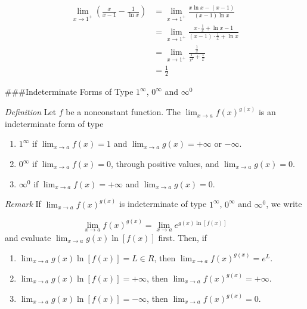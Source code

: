 \documentclass[
  letterpaper,
  DIV=11,
  numbers=noendperiod]{scrartcl}
\theoremstyle{plain}
\theoremstyle{remark}
\begin{document}
\[
\begin{aligned}
\displaystyle\lim_{x\to 1^+}{\left(\frac{x}{x-1}-\frac{1}{\ln x}\right)}&=\displaystyle\lim_{x\to 1^+}{\frac{x\ln x -(x-1)}{(x-1)\ln x}}\\&=\displaystyle\lim_{x\to 1^+}{\frac{x\cdot \frac{1}{x}+\ln x-1}{(x-1)\cdot \frac{1}{x}+\ln x}}\\&=\displaystyle\lim_{x\to 1^+}{\frac{\frac{1}{x}}{\frac{1}{x^2}+\frac{1}{x}}}\\&=\frac{1}{2}
\end{aligned}
\]

\#\#\#Indeterminate Forms of Type \(1^\infty\), \(0^\infty\) and
\(\infty ^0\)

\emph{Definition} Let \(f\) be a nonconstant function. The
\(\displaystyle\lim_{x\to a}{f(x)^{g(x)}}\) is an indeterminate form of
type

\begin{enumerate}
\def\labelenumi{\arabic{enumi}.}
\item
  \(1^\infty\) if \(\displaystyle\lim_{x\to a}{f(x)=1}\) and
  \(\displaystyle\lim_{x\to a}{g(x)=+\infty}\) or \(-\infty\).
\item
  \(0^\infty\) if \(\displaystyle\lim_{x\to a}{f(x)=0}\), through
  positive values, and \(\displaystyle\lim_{x\to a}{g(x)=0}\).
\item
  \(\infty ^0\) if \(\displaystyle\lim_{x\to a}{f(x)=+\infty}\) and
  \(\displaystyle\lim_{x\to a}{g(x)=0}\).
\end{enumerate}

\emph{Remark} If \(\displaystyle\lim_{x\to a}{f(x)^{g(x)}}\) is
indeterminate of type \(1^\infty\), \(0^\infty\) and \(\infty ^0\), we
write

\[
\displaystyle\lim_{x\to a}{f(x)^{g(x)}}=\displaystyle\lim_{x\to a}{e^{g(x) \ln [f(x)]}}
\] and evaluate \(\displaystyle\lim_{x\to a}{g(x) \ln [f(x)]}\) first.
Then, if

\begin{enumerate}
\def\labelenumi{\arabic{enumi}.}
\item
  \(\displaystyle\lim_{x\to a}{g(x) \ln [f(x)]}=L \in R\), then
  \(\displaystyle\lim_{x\to a}{f(x)^{g(x)}}=e^L\).
\item
  \(\displaystyle\lim_{x\to a}{g(x) \ln [f(x)]}=+\infty\), then
  \(\displaystyle\lim_{x\to a}{f(x)^{g(x)}}=+\infty\).
\item
  \(\displaystyle\lim_{x\to a}{g(x) \ln [f(x)]}=-\infty\), then
  \(\displaystyle\lim_{x\to a}{f(x)^{g(x)}}=0\).
\end{enumerate}
\end{document}

